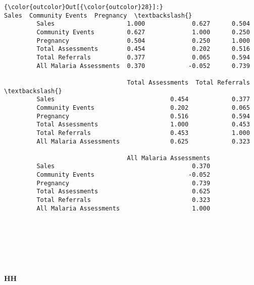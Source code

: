 \documentclass[11pt]{article}
\begin{document}
\begin{Verbatim}[commandchars=\\\{\}]
{\color{outcolor}Out[{\color{outcolor}28}]:}                          Sales  Community Events  Pregnancy  \textbackslash{}
         Sales                    1.000             0.627      0.504   
         Community Events         0.627             1.000      0.250   
         Pregnancy                0.504             0.250      1.000   
         Total Assessments        0.454             0.202      0.516   
         Total Referrals          0.377             0.065      0.594   
         All Malaria Assessments  0.370            -0.052      0.739   
         
                                  Total Assessments  Total Referrals  \textbackslash{}
         Sales                                0.454            0.377   
         Community Events                     0.202            0.065   
         Pregnancy                            0.516            0.594   
         Total Assessments                    1.000            0.453   
         Total Referrals                      0.453            1.000   
         All Malaria Assessments              0.625            0.323   
         
                                  All Malaria Assessments  
         Sales                                      0.370  
         Community Events                          -0.052  
         Pregnancy                                  0.739  
         Total Assessments                          0.625  
         Total Referrals                            0.323  
         All Malaria Assessments                    1.000  
\end{Verbatim}
            
    \begin{center}
    \end{center}
    { \hspace*{\fill} \\}
    
    \begin{center}
    \end{center}
    { \hspace*{\fill} \\}
    
    \begin{center}
    \end{center}
    { \hspace*{\fill} \\}
    
    \paragraph{HH}\label{hh}


    
    
    
    
\end{document}
